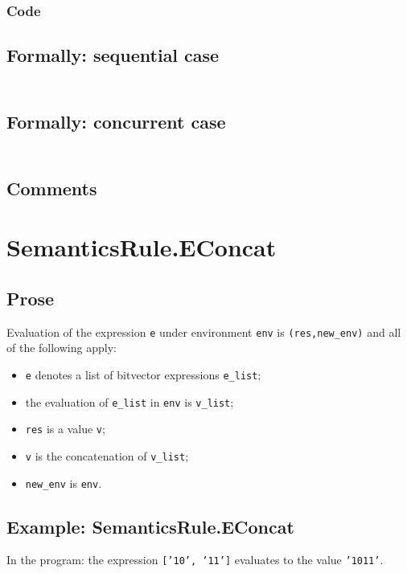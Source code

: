 \documentclass{book}
\begin{document}
  \subsubsection{Code}

  \subsection{Formally: sequential case}
  \begin{align}
  \end{align} 

  \subsection{Formally: concurrent case}
  \begin{align}
  \end{align} 

  \subsection{Comments}

\section{SemanticsRule.EConcat \label{sec:SemanticsRule.EConcat}}

  \subsection{Prose}
  Evaluation of the expression \texttt{e} under environment \texttt{env} is
  \texttt{(res,new\_env)} and all of the following apply:
  \begin{itemize}
  \item \texttt{e} denotes a list of bitvector expressions \texttt{e\_list};
  \item the evaluation of \texttt{e\_list} in \texttt{env} is \texttt{v\_list};
  \item \texttt{res} is a value \texttt{v};
  \item \texttt{v} is the concatenation of \texttt{v\_list};
  \item \texttt{new\_env} is \texttt{env}.
  \end{itemize}

  \subsection{Example: SemanticsRule.EConcat}
    In the program:
    the expression \texttt{['10', '11']} evaluates to the value \texttt{'1011'}.
\end{document}
